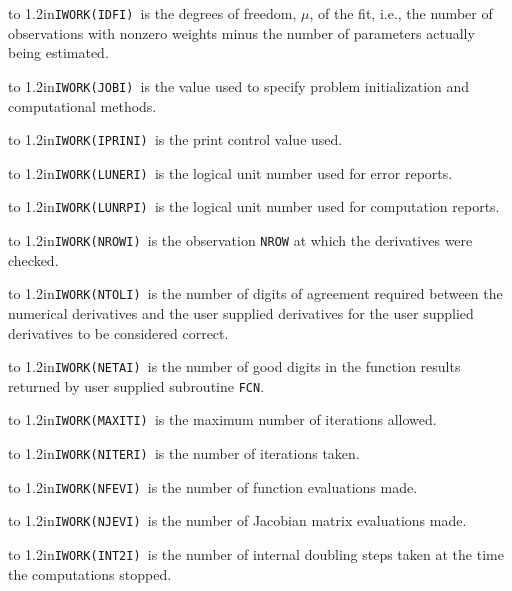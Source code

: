 \hangindent\wd\mybox{}\noindent\hbox to
1.2in{\hfill\tt IWORK(IDFI) }is the degrees of freedom, $\mu$, of the fit, i.e., the number of observations with nonzero weights minus the number of parameters actually being estimated.\bigskip

\hangindent\wd\mybox{}\noindent\hbox to
1.2in{\hfill\tt IWORK(JOBI) }is the value used to specify problem initialization and computational methods.\bigskip

\hangindent\wd\mybox{}\noindent\hbox to
1.2in{\hfill\tt IWORK(IPRINI) }is the print control value used.\bigskip

\hangindent\wd\mybox{}\noindent\hbox to
1.2in{\hfill\tt IWORK(LUNERI) }is the logical unit number used for error reports.\bigskip

\hangindent\wd\mybox{}\noindent\hbox to
1.2in{\hfill\tt IWORK(LUNRPI) }is the logical unit number used for computation reports.\bigskip

\hangindent\wd\mybox{}\noindent\hbox to
1.2in{\hfill\tt IWORK(NROWI) }is the observation {\tt NROW} at which the derivatives were checked.\bigskip

\hangindent\wd\mybox{}\noindent\hbox to
1.2in{\hfill\tt IWORK(NTOLI) }is the number of digits of agreement required between the numerical derivatives and the user supplied derivatives for the user supplied derivatives to be considered correct.\bigskip

\hangindent\wd\mybox{}\noindent\hbox to
1.2in{\hfill\tt IWORK(NETAI) }is the number of good digits in the function results returned by user supplied subroutine {\tt FCN}.\bigskip

\hangindent\wd\mybox{}\noindent\hbox to
1.2in{\hfill\tt IWORK(MAXITI) }is the maximum number of iterations allowed.\bigskip

\hangindent\wd\mybox{}\noindent\hbox to
1.2in{\hfill\tt IWORK(NITERI) }is the number of iterations taken.\bigskip

\hangindent\wd\mybox{}\noindent\hbox to
1.2in{\hfill\tt IWORK(NFEVI) }is the number of function evaluations made.\bigskip

\hangindent\wd\mybox{}\noindent\hbox to
1.2in{\hfill\tt IWORK(NJEVI) }is the number of Jacobian matrix evaluations made.\bigskip

\hangindent\wd\mybox{}\noindent\hbox to
1.2in{\hfill\tt IWORK(INT2I) }is the number of internal doubling steps taken at the time the computations stopped.\bigskip

